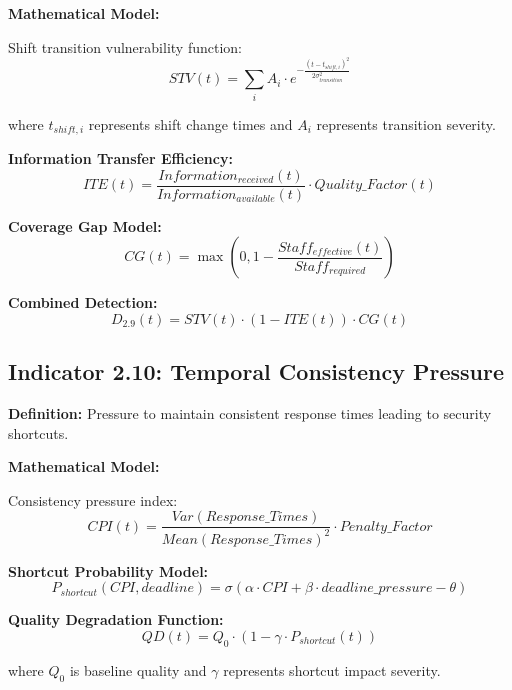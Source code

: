\documentclass[11pt,a4paper]{article}
\begin{document}
\textbf{Mathematical Model:}

Shift transition vulnerability function:
\begin{equation}
STV(t) = \sum_{i} A_i \cdot e^{-\frac{(t-t_{shift,i})^2}{2\sigma_{transition}^2}}
\end{equation}

where $t_{shift,i}$ represents shift change times and $A_i$ represents transition severity.

\textbf{Information Transfer Efficiency:}
\begin{equation}
ITE(t) = \frac{Information_{received}(t)}{Information_{available}(t)} \cdot Quality\_Factor(t)
\end{equation}

\textbf{Coverage Gap Model:}
\begin{equation}
CG(t) = \max(0, 1 - \frac{Staff_{effective}(t)}{Staff_{required}})
\end{equation}

\textbf{Combined Detection:}
\begin{equation}
D_{2.9}(t) = STV(t) \cdot (1 - ITE(t)) \cdot CG(t)
\end{equation}

\subsection{Indicator 2.10: Temporal Consistency Pressure}

\textbf{Definition:} Pressure to maintain consistent response times leading to security shortcuts.

\textbf{Mathematical Model:}

Consistency pressure index:
\begin{equation}
CPI(t) = \frac{Var(Response\_Times)}{Mean(Response\_Times)^2} \cdot Penalty\_Factor
\end{equation}

\textbf{Shortcut Probability Model:}
\begin{equation}
P_{shortcut}(CPI, deadline) = \sigma(\alpha \cdot CPI + \beta \cdot deadline\_pressure - \theta)
\end{equation}

\textbf{Quality Degradation Function:}
\begin{equation}
QD(t) = Q_0 \cdot (1 - \gamma \cdot P_{shortcut}(t))
\end{equation}

where $Q_0$ is baseline quality and $\gamma$ represents shortcut impact severity.
\end{document}
